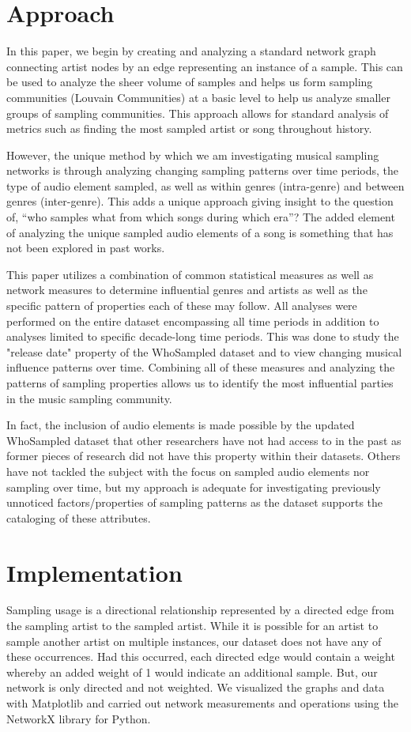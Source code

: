 \documentclass[pageno]{jpaper}
\begin{document}
\section{Approach}
In this paper, we begin by creating and analyzing a standard network graph connecting artist nodes by an edge representing an instance of a sample. This can be used to analyze the sheer volume of samples and helps us form sampling communities (Louvain Communities) at a basic level to help us analyze smaller groups of sampling communities. This approach allows for standard analysis of metrics such as finding the most sampled artist or song throughout history. 

However, the unique method by which we am investigating musical sampling networks is through analyzing changing sampling patterns over time periods, the type of audio element sampled, as well as within genres (intra-genre) and between genres (inter-genre). This adds a unique approach giving insight to the question of, “who samples what from which songs during which era”? The added element of analyzing the unique sampled audio elements of a song is something that has not been explored in past works.

This paper utilizes a combination of common statistical measures as well as network measures to determine influential genres and artists as well as the specific pattern of properties each of these may follow. All analyses were performed on the entire dataset encompassing all time periods in addition to analyses limited to specific decade-long time periods. This was done to study the "release date" property of the WhoSampled dataset and to view changing musical influence patterns over time. Combining all of these measures and analyzing the patterns of sampling properties allows us to identify the most influential parties in the music sampling community.

In fact, the inclusion of audio elements is made possible by the updated WhoSampled dataset that other researchers have not had access to in the past as former pieces of research did not have this property within their datasets. Others have not tackled the subject with the focus on sampled audio elements nor sampling over time, but my approach is adequate for investigating previously unnoticed factors/properties of sampling patterns as the dataset supports the cataloging of these attributes.

\section{Implementation}
Sampling usage is a directional relationship represented by a directed edge from the sampling artist to the sampled artist. While it is possible for an artist to sample another artist on multiple instances, our dataset does not have any of these occurrences. Had this occurred, each directed edge would contain a weight whereby an added weight of 1 would indicate an additional sample. But, our network is only directed and not weighted. We visualized the graphs and data with Matplotlib and carried out network measurements and operations using the NetworkX library for Python. \cite{NetworkX,Matplotlib}
\end{document}
